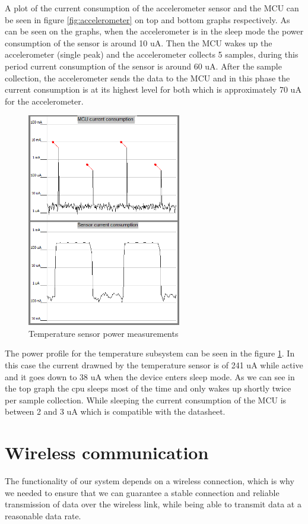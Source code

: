 A plot of the current consumption of the accelerometer sensor and the MCU can be seen in figure \ref{fig:accelerometer} on top and bottom graphs respectively. As can be seen on the graphs, when the accelerometer is in the sleep mode the power consumption of the sensor is around 10 uA. Then the MCU wakes up the accelerometer (single peak) and the accelerometer collects 5 samples, during this period current consumption of the sensor is around 60 uA. After the sample collection, the accelerometer sends the data to the MCU and in this phase the current consumption is at its highest level for both which is approximately 70 uA for the accelerometer.


\begin{figure}
\centering
\includegraphics[width=0.6\textwidth]{Images/tmp_merged}
\caption{Temperature sensor power measurements}
\label{fig:temp_sensor}
\end{figure}

The power profile for the temperature subsystem can be seen in the figure \ref{fig:temp_sensor}. In this case the current drawned by the temperature sensor is of 241 uA while active and it goes down to 38 uA when the device enters sleep mode. As we can see in the top graph the cpu sleeps most of the time and only wakes up shortly twice per sample collection. While sleeping the current consumption of the MCU is between 2 and 3 uA which is compatible with the datasheet.


\section{Wireless communication}
\label{sec:wireless_testing}
The functionality of our system depends on a wireless connection, which is why we needed to ensure that we can guarantee a stable connection and reliable transmission of data over the wireless link, while being able to transmit data at a reasonable data rate.


